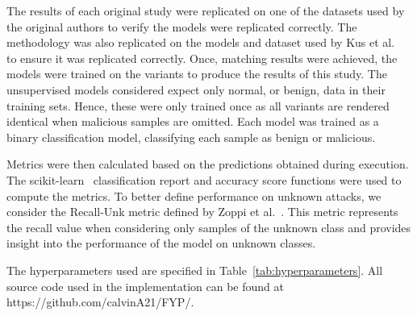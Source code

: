 The results of each original study were replicated on one of the datasets used
by the original authors to verify the models were replicated correctly. The
methodology was also replicated on the models and dataset used by Kus et
al.~\cite{Kus} to ensure it was replicated correctly. Once, matching results
were achieved, the models were trained on the variants to produce the results
of this study. The unsupervised models considered expect only normal, or
benign, data in their training sets. Hence, these were only trained once as all
variants are rendered identical when malicious samples are omitted. Each model
was trained as a binary classification model, classifying each sample as benign
or malicious.

Metrics were then calculated based on the predictions obtained during
execution. The scikit-learn~\cite{scikit-learn} classification report and
accuracy score functions were used to compute the metrics. To better define
performance on unknown attacks, we consider the Recall-Unk metric defined by
Zoppi et al.~\cite{Zoppi}. This metric represents the recall value when
considering only samples of the unknown class and provides insight into the
performance of the model on unknown classes.


The hyperparameters used are specified in Table~\ref{tab:hyperparameters}. All
source code used in the implementation can be found at
https://github.com/calvinA21/FYP/.


